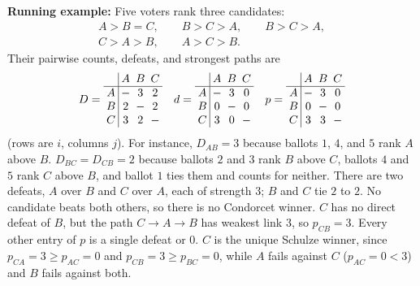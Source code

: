 \textbf{Running example:} Five voters rank three candidates:
\[
  \begin{array}{c}
    A > B = C, \qquad B > C > A, \qquad B > C > A,\\
    C > A > B, \qquad A > C > B.
  \end{array}
\]
Their pairwise counts, defeats, and strongest paths are
\[
  \setlength{\arraycolsep}{2.5pt}
  D =\begin{array}{c|ccc}
        & A & B & C \\ \hline
      A & - & 3 & 2 \\
      B & 2 & - & 2 \\
      C & 3 & 2 & -
      \end{array}
  \quad
  d = \begin{array}{c|ccc}
        & A & B & C \\ \hline
      A & - & 3 & 0 \\
      B & 0 & - & 0 \\
      C & 3 & 0 & -
      \end{array}
  \quad
  p = \begin{array}{c|ccc}
        & A & B & C \\ \hline
      A & - & 3 & 0 \\
      B & 0 & - & 0 \\
      C & 3 & 3 & -
      \end{array}
\]
(rows are $i$, columns $j$). For instance, $D_{AB} = 3$ because ballots
$1$, $4$, and $5$ rank $A$ above $B$. $D_{BC} = D_{CB} = 2$ because
ballots $2$ and $3$ rank $B$ above $C$, ballots $4$ and $5$ rank $C$
above $B$, and ballot $1$ ties them and counts for neither. There are two defeats, $A$ over $B$ and $C$
over $A$, each of strength $3$; $B$ and $C$ tie $2$ to $2$. No candidate
beats both others, so there is no Condorcet winner. $C$ has no direct
defeat of $B$, but the path $C \to A \to B$ has weakest link $3$, so
$p_{CB} = 3$. Every other entry of $p$ is a single defeat or $0$. $C$ is
the unique Schulze winner, since $p_{CA} = 3 \ge p_{AC} = 0$ and $p_{CB}
= 3 \ge p_{BC} = 0$, while $A$ fails against $C$ ($p_{AC} = 0 < 3$) and
$B$ fails against both.

